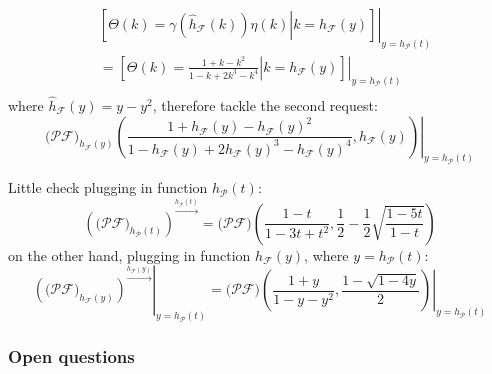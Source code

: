 \documentclass[11pt,a4paper]{article} %
\begin{document}
    \begin{displaymath}
        \begin{split}
            &\left.\left[\left.\Theta(k)=\gamma(\hat{h}_{\mathcal{F}}(k))\eta(k) \right| k=h_{\mathcal{F}}(y) \right]\right|_{y=h_{\mathcal{P}}(t)}\\
            &= \left.\left[\left.\Theta(k)=\frac{1+k-k^2}{1-k+ 2k^3 - k^4} \right| k=h_{\mathcal{F}}(y) \right]\right|_{y=h_{\mathcal{P}}(t)}\\
        \end{split}
    \end{displaymath}
    where $\hat{h}_{\mathcal{F}}(y)=y-y^2$, therefore tackle the second request:
    \begin{displaymath}
        \left.\big(\mathcal{P}\mathcal{F}\big)_{h_{\mathcal{F}}(y)} \left(
            \frac{1+h_{\mathcal{F}}(y)-h_{\mathcal{F}}(y)^2}{1-h_{\mathcal{F}}(y)+ 2h_{\mathcal{F}}(y)^3 - h_{\mathcal{F}}(y)^4} ,
            h_{\mathcal{F}}(y) \right)\right|_{y=h_{\mathcal{P}}(t)}
    \end{displaymath}
    
    Little check plugging in function $h_{\mathcal{P}}(t)$:
    \begin{displaymath}
        \left(\big(\mathcal{P}\mathcal{F}\big)_{h_{\mathcal{P}}(t)}\right)^{\stackrel{h_{\mathcal{P}}(t)}{\rightarrow}}
            = \big(\mathcal{P}\mathcal{F}\big)\left(\frac{1-t}{1-3t+t^2}, \frac{1}{2}-\frac{1}{2}\sqrt{\frac{1-5t}{1-t}} \right)
    \end{displaymath}
    on the other hand, plugging in function $h_{\mathcal{F}}(y)$, where $y=h_{\mathcal{P}}(t)$:
    \begin{displaymath}
        \left.\left(\big(\mathcal{P}\mathcal{F}\big)_{h_{\mathcal{F}}(y)}\right)^{\stackrel{h_{\mathcal{F}}(y)}{\rightarrow}}\right|_{y=h_{\mathcal{P}}(t)}
            = \left.\big(\mathcal{P}\mathcal{F}\big)\left(\frac{1+y}{1-y-y^2}, \frac{1-\sqrt{1-4y}}{2} \right)\right|_{y=h_{\mathcal{P}}(t)}
    \end{displaymath}


    

    \subsubsection{Open questions}
\end{document}
